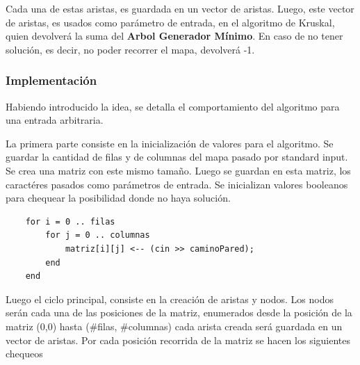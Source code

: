    Cada una de estas aristas, es guardada en un vector de aristas.
    Luego, este vector de aristas, es usados como parámetro de entrada, en el algoritmo de Kruskal, quien devolverá la suma del \textbf{Arbol Generador Mínimo}. En caso de no tener solución, es decir, no poder recorrer el mapa, devolverá -1.



	\subsubsection{Implementación}\label{ej2_imp}


	Habiendo introducido la idea, se detalla el comportamiento del algoritmo para
	una entrada arbitraria. \par 

	La primera parte consiste en la inicialización de valores para el algoritmo. Se guardar la cantidad de filas y de columnas del mapa pasado por standard input. Se crea una matriz con este mismo tamaño. Luego se guardan en esta matriz, los caractéres pasados como parámetros de entrada. Se inicializan valores booleanos para chequear la posibilidad donde no haya solución.

	\begin{codesnippet}
    \begin{verbatim}
    for i = 0 .. filas
        for j = 0 .. columnas
            matriz[i][j] <-- (cin >> caminoPared);
        end
    end
    \end{verbatim}
    \end{codesnippet}

	Luego el ciclo principal, consiste en la creación de aristas y nodos. Los nodos serán cada una de las posiciones de la matriz, enumerados desde la posición de la matriz (0,0) hasta (\#filas, \#columnas) cada arista creada será guardada en un vector de aristas. Por cada posición recorrida de la matriz se hacen los siguientes chequeos

